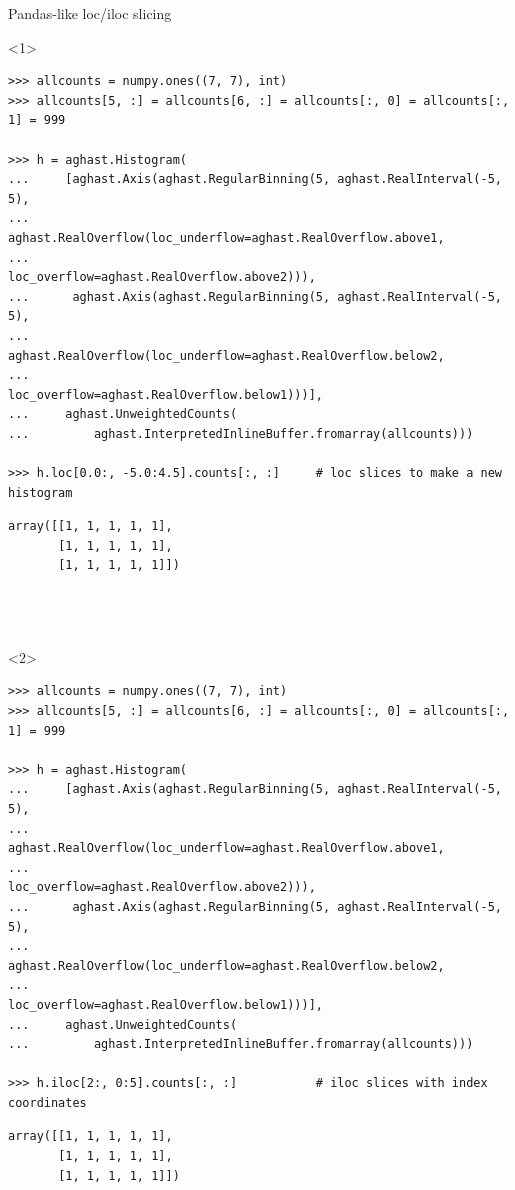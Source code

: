\documentclass[aspectratio=169]{beamer}
\begin{document}
\begin{frame}[fragile]{Pandas-like loc/iloc slicing}
\scriptsize
\vspace{0.4 cm}
\begin{onlyenv}<1>
\begin{verbatim}
>>> allcounts = numpy.ones((7, 7), int)
>>> allcounts[5, :] = allcounts[6, :] = allcounts[:, 0] = allcounts[:, 1] = 999

>>> h = aghast.Histogram(
...     [aghast.Axis(aghast.RegularBinning(5, aghast.RealInterval(-5, 5),
...                  aghast.RealOverflow(loc_underflow=aghast.RealOverflow.above1,
...                                      loc_overflow=aghast.RealOverflow.above2))),
...      aghast.Axis(aghast.RegularBinning(5, aghast.RealInterval(-5, 5),
...                  aghast.RealOverflow(loc_underflow=aghast.RealOverflow.below2,
...                                      loc_overflow=aghast.RealOverflow.below1)))],
...     aghast.UnweightedCounts(
...         aghast.InterpretedInlineBuffer.fromarray(allcounts)))

>>> h.loc[0.0:, -5.0:4.5].counts[:, :]     # loc slices to make a new histogram
\end{verbatim}
\begin{verbatim}
array([[1, 1, 1, 1, 1], 
       [1, 1, 1, 1, 1], 
       [1, 1, 1, 1, 1]])




\end{verbatim}
\end{onlyenv}
\begin{onlyenv}<2>
\begin{verbatim}
>>> allcounts = numpy.ones((7, 7), int)
>>> allcounts[5, :] = allcounts[6, :] = allcounts[:, 0] = allcounts[:, 1] = 999

>>> h = aghast.Histogram(
...     [aghast.Axis(aghast.RegularBinning(5, aghast.RealInterval(-5, 5),
...                  aghast.RealOverflow(loc_underflow=aghast.RealOverflow.above1,
...                                      loc_overflow=aghast.RealOverflow.above2))),
...      aghast.Axis(aghast.RegularBinning(5, aghast.RealInterval(-5, 5),
...                  aghast.RealOverflow(loc_underflow=aghast.RealOverflow.below2,
...                                      loc_overflow=aghast.RealOverflow.below1)))],
...     aghast.UnweightedCounts(
...         aghast.InterpretedInlineBuffer.fromarray(allcounts)))

>>> h.iloc[2:, 0:5].counts[:, :]           # iloc slices with index coordinates
\end{verbatim}
\begin{verbatim}
array([[1, 1, 1, 1, 1], 
       [1, 1, 1, 1, 1], 
       [1, 1, 1, 1, 1]])





\end{verbatim}
\end{onlyenv}
\end{frame}
\end{document}
